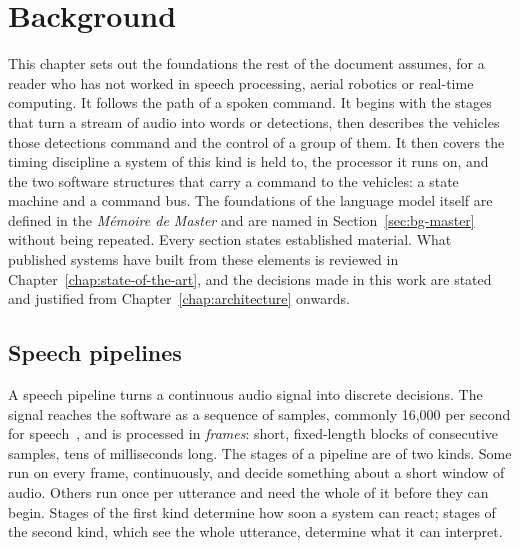 %

\chapter{Background}
\label{chap:background}
This chapter sets out the foundations the rest of the document assumes, for a reader who has not
worked in speech processing, aerial robotics or real-time computing. It follows the path of a spoken
command. It begins with the stages that turn a stream of audio into words or detections, then
describes the vehicles those detections command and the control of a group of them. It then covers
the timing discipline a system of this kind is held to, the processor it runs on, and the two
software structures that carry a command to the vehicles: a state machine and a command bus. The
foundations of the language model itself are defined in the \emph{M\'emoire de Master} and are named
in Section~\ref{sec:bg-master} without being repeated. Every section states established material.
What published systems have built from these elements is reviewed in
Chapter~\ref{chap:state-of-the-art}, and the decisions made in this work are stated and justified
from Chapter~\ref{chap:architecture} onwards.

\section{Speech pipelines}
\label{sec:bg-speech}
A speech pipeline turns a continuous audio signal into discrete decisions. The signal reaches the
software as a sequence of samples, commonly 16{,}000 per second for speech~\cite{speechcmd,whisper},
and is processed in \emph{frames}: short, fixed-length blocks of consecutive samples, tens of
milliseconds long. The stages of a pipeline are of two kinds. Some run on every frame, continuously,
and decide something about a short window of audio. Others run once per utterance and need the whole
of it before they can begin. Stages of the first kind determine how soon a system can react; stages
of the second kind, which see the whole utterance, determine what it can interpret.

